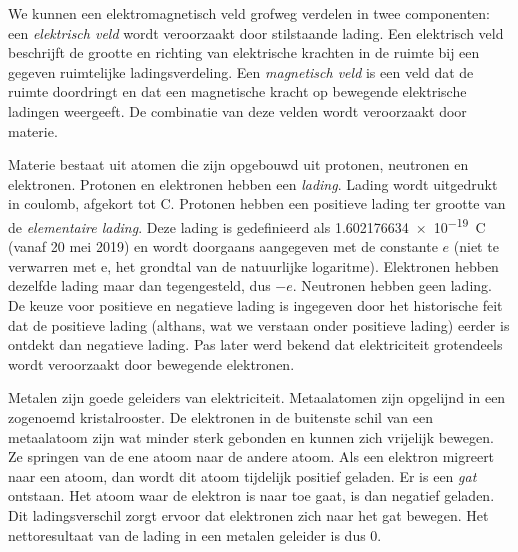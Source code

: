 We kunnen een elektromagnetisch veld grofweg verdelen in twee componenten: een \textsl{elektrisch veld} wordt veroorzaakt door stilstaande lading. Een elektrisch veld beschrijft de grootte en richting van elektrische krachten in de ruimte bij een gegeven ruimtelijke ladingsverdeling. Een \textsl{magnetisch veld} is een veld dat de ruimte doordringt en dat een magnetische kracht op bewegende elektrische ladingen weergeeft. De combinatie van deze velden wordt veroorzaakt door materie.

Materie bestaat uit atomen die zijn opgebouwd uit protonen, neutronen en elektronen. Protonen en elektronen hebben een \textsl{lading}. Lading wordt uitgedrukt in coulomb, afgekort tot \si{\coulomb}. Protonen hebben een positieve lading ter grootte van de \textsl{elementaire lading}. Deze lading is gedefinieerd als \SI{1.602176634e-19}{\coulomb} (vanaf 20 mei 2019) en wordt doorgaans aangegeven met de constante $e$ (niet te verwarren met e, het grondtal van de natuurlijke logaritme). Elektronen hebben dezelfde lading maar dan tegengesteld, dus $-e$. Neutronen hebben geen lading. De keuze voor positieve en negatieve lading is ingegeven door het historische feit dat de positieve lading (althans, wat we verstaan onder positieve lading) eerder is ontdekt dan negatieve lading. Pas later werd bekend dat elektriciteit grotendeels wordt veroorzaakt door bewegende elektronen.

Metalen zijn goede geleiders van elektriciteit. Metaalatomen zijn opgelijnd in een zogenoemd kristalrooster. De elektronen in de buitenste schil van een metaalatoom zijn wat minder sterk gebonden en kunnen zich vrijelijk bewegen. Ze springen van de ene atoom naar de andere atoom. Als een elektron migreert naar een atoom, dan wordt dit atoom tijdelijk positief geladen. Er is een \textsl{gat} ontstaan. Het atoom waar de elektron is naar toe gaat, is dan negatief geladen. Dit ladingsverschil zorgt ervoor dat elektronen zich naar het gat bewegen. Het nettoresultaat van de lading in een metalen geleider is dus 0.


